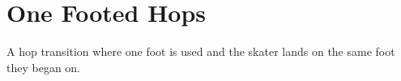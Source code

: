 \section{One Footed Hops}
\label{sec:transitions/one_foot_hop}

A hop transition where one foot is used and the skater lands on the same foot they began on.

